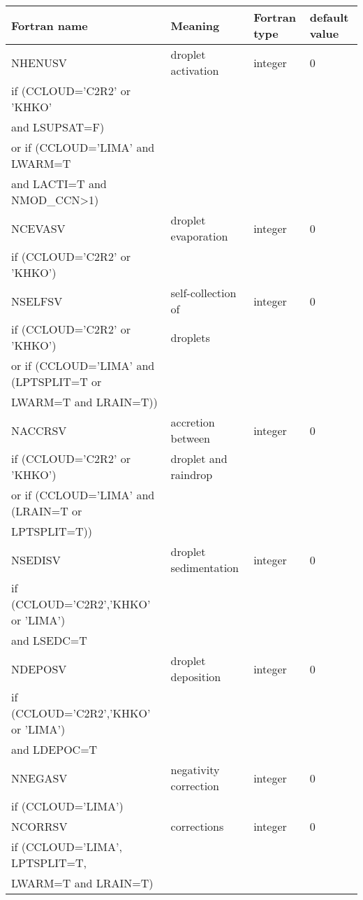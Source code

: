 \begin{longtable} {|p{}|p{}|>{\centering}p{}|p{}<{\centering}|}
\hline
Fortran name & Meaning & Fortran type & default value \\
\hline \hline
\endhead
NHENUSV & droplet activation & integer & 0 \\ \nopagebreak
if (CCLOUD='C2R2' or 'KHKO' &&&\\ \nopagebreak
and LSUPSAT=F)  &&&\\ \nopagebreak
or if (CCLOUD='LIMA' and LWARM=T &&&\\ \nopagebreak
and LACTI=T and NMOD\_CCN>1)&&&\\\hline
NCEVASV & droplet evaporation & integer & 0 \\ \nopagebreak
if (CCLOUD='C2R2' or 'KHKO') &&&\\\hline
NSELFSV & self-collection of  & integer & 0 \\ \nopagebreak
if (CCLOUD='C2R2' or 'KHKO') & droplets&&\\ \nopagebreak
or if (CCLOUD='LIMA' and (LPTSPLIT=T or &&&\\ \nopagebreak
LWARM=T and LRAIN=T))&&&\\\hline
NACCRSV & accretion between  & integer & 0 \\ \nopagebreak
if (CCLOUD='C2R2' or 'KHKO') &droplet and raindrop&&\\ \nopagebreak
or if (CCLOUD='LIMA' and (LRAIN=T or &&& \\ \nopagebreak
LPTSPLIT=T)) &&& \\\hline
NSEDISV & droplet sedimentation& integer & 0 \\ \nopagebreak
if (CCLOUD='C2R2','KHKO' or 'LIMA') &&&\\ \nopagebreak
and LSEDC=T &&&\\\hline
NDEPOSV & droplet deposition& integer & 0 \\ \nopagebreak
if (CCLOUD='C2R2','KHKO' or 'LIMA') &&&\\ \nopagebreak
and LDEPOC=T &&&\\\hline
NNEGASV & negativity correction& integer & 0 \\ \nopagebreak
if (CCLOUD='LIMA') &&&\\\hline

NCORRSV & corrections & integer & 0 \\ \nopagebreak
if (CCLOUD='LIMA', LPTSPLIT=T, &&&\\ \nopagebreak
LWARM=T and LRAIN=T)&&& \\\hline


\end{longtable}
